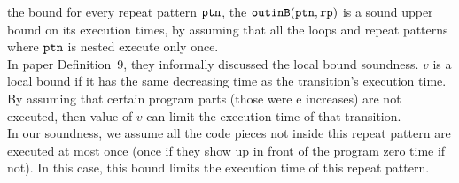 the bound for every repeat pattern $\mathtt{ptn}$, the $\mathtt{outinB}(\mathtt{ptn}, \mathtt{rp})$
is a sound upper bound on its execution times, by assuming
that all the loops and repeat patterns where $\mathtt{ptn}$ is nested execute only once.
\\
In paper \cite{sinn2017complexity} Definition~9, they informally discussed the local bound soundness.
$v$ is a local bound if it has the same decreasing time as the transition's execution time.
By assuming that certain program parts (those were e increases) are not executed,
then value of $v$ can limit the execution time of that transition.
\\
In our soundness, we assume all the code pieces not inside this repeat pattern are executed at most once (once if they show up in front of the program
zero time if not).
In this case, this bound limits the execution time of this repeat pattern.